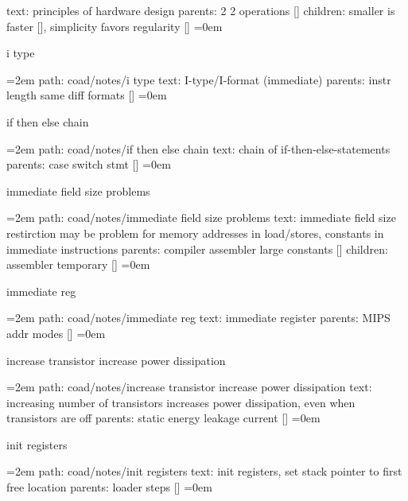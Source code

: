 text:  principles of hardware design
\smallskip
parents:  2 2 operations []
\smallskip
children: smaller is faster [], simplicity favors regularity []
\smallskip
\leftskip=0em
\par\endgroup
\bigskip
{}
i type
\smallskip
\par\begingroup
\leftskip=2em
path: coad/notes/i type
\smallskip
text:  I-type/I-format (immediate)
\smallskip
parents:  instr length same diff formats []
\smallskip
\leftskip=0em
\par\endgroup
\bigskip
{}
if then else chain
\smallskip
\par\begingroup
\leftskip=2em
path: coad/notes/if then else chain
\smallskip
text:  chain of if-then-else-statements
\smallskip
parents:  case switch stmt []
\smallskip
\leftskip=0em
\par\endgroup
\bigskip
{}
immediate field size problems
\smallskip
\par\begingroup
\leftskip=2em
path: coad/notes/immediate field size problems
\smallskip
text:  immediate field size restirction may be problem for memory addresses in load/stores, constants in immediate instructions
\smallskip
parents:  compiler assembler large constants []
\smallskip
children: assembler temporary []
\smallskip
\leftskip=0em
\par\endgroup
\bigskip
{}
immediate reg
\smallskip
\par\begingroup
\leftskip=2em
path: coad/notes/immediate reg
\smallskip
text:  immediate register
\smallskip
parents:  MIPS addr modes []
\smallskip
\leftskip=0em
\par\endgroup
\bigskip
{}
increase transistor increase power dissipation
\smallskip
\par\begingroup
\leftskip=2em
path: coad/notes/increase transistor increase power dissipation
\smallskip
text:  increasing number of transistors increases power dissipation, even when transistors are off
\smallskip
parents:  static energy leakage current []
\smallskip
\leftskip=0em
\par\endgroup
\bigskip
{}
init registers
\smallskip
\par\begingroup
\leftskip=2em
path: coad/notes/init registers
\smallskip
text:  init registers, set stack pointer to first free location
\smallskip
parents:  loader steps []
\smallskip
\leftskip=0em
\par\endgroup
\bigskip
{}
